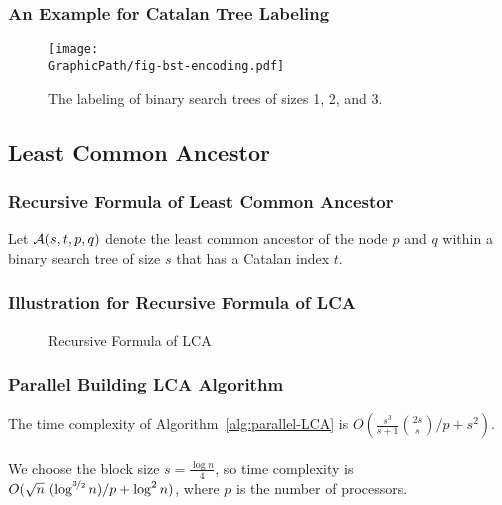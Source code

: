 \begin{frame}
	\frametitle{An Example for Catalan Tree Labeling}
	\begin{figure}[!thb]
	  \centering
	  \texttt{[image: \\GraphicPath/fig-bst-encoding.pdf]}
	  \caption{The labeling of binary search trees of sizes 1, 2, and 3.}
	  \label{fig:labelingBST}
	\end{figure}
\end{frame}

\subsection{Least Common Ancestor}
\begin{frame}
	\frametitle{Recursive Formula of Least Common Ancestor}
	Let ${\cal A}(s, t, p, q)$ denote the least common ancestor of the
	node $p$ and $q$ within a binary search tree of size $s$ that has a
	Catalan index $t$.
	\begin{center}
		\scalebox{.7} { \begin{minipage}{1.4\textwidth}
			
			\end{minipage}
		}
	\end{center}
\end{frame}

\begin{withoutheadline}
\begin{frame}
	\frametitle{Illustration for Recursive Formula of LCA}
	\begin{center}
		\scalebox{0.8} { \begin{minipage}{1\textwidth}
			\begin{figure}[!thb]
			  \centering {} 
			  \caption{Recursive Formula of LCA}
			\end{figure}
			\end{minipage}
		}
	\end{center}
\end{frame}
\end{withoutheadline}

\begin{frame}
	\frametitle{Parallel Building LCA Algorithm}
	The time complexity of Algorithm~\ref{alg:parallel-LCA} is
	$O(\frac{s^3}{s+1} \binom{2s}{s} / p + s^2)$.
	\\~\\
	We choose the block size $s = {{\frac{\log n}{4}}}$, so time
	complexity is $O(\sqrt{n} \; (\log^{\nicefrac{3}{2}} n) / p + \log^2 n )$, where
	$p$ is the number of processors.
	\begin{center}
		\scalebox{.7} { \begin{minipage}{1.4\textwidth}
			
			\end{minipage}
		}
	\end{center}
\end{frame}

